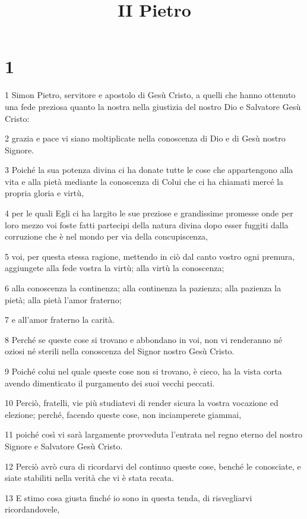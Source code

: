 

\title{II Pietro}


\chapter{1}

\par 1 Simon Pietro, servitore e apostolo di Gesù Cristo, a quelli che hanno ottenuto una fede preziosa quanto la nostra nella giustizia del nostro Dio e Salvatore Gesù Cristo:
\par 2 grazia e pace vi siano moltiplicate nella conoscenza di Dio e di Gesù nostro Signore.
\par 3 Poiché la sua potenza divina ci ha donate tutte le cose che appartengono alla vita e alla pietà mediante la conoscenza di Colui che ci ha chiamati mercé la propria gloria e virtù,
\par 4 per le quali Egli ci ha largito le sue preziose e grandissime promesse onde per loro mezzo voi foste fatti partecipi della natura divina dopo esser fuggiti dalla corruzione che è nel mondo per via della concupiscenza,
\par 5 voi, per questa stessa ragione, mettendo in ciò dal canto vostro ogni premura, aggiungete alla fede vostra la virtù; alla virtù la conoscenza;
\par 6 alla conoscenza la continenza; alla continenza la pazienza; alla pazienza la pietà; alla pietà l'amor fraterno;
\par 7 e all'amor fraterno la carità.
\par 8 Perché se queste cose si trovano e abbondano in voi, non vi renderanno né oziosi né sterili nella conoscenza del Signor nostro Gesù Cristo.
\par 9 Poiché colui nel quale queste cose non si trovano, è cieco, ha la vista corta avendo dimenticato il purgamento dei suoi vecchi peccati.
\par 10 Perciò, fratelli, vie più studiatevi di render sicura la vostra vocazione ed elezione; perché, facendo queste cose, non inciamperete giammai,
\par 11 poiché così vi sarà largamente provveduta l'entrata nel regno eterno del nostro Signore e Salvatore Gesù Cristo.
\par 12 Perciò avrò cura di ricordarvi del continuo queste cose, benché le conosciate, e siate stabiliti nella verità che vi è stata recata.
\par 13 E stimo cosa giusta finché io sono in questa tenda, di risvegliarvi ricordandovele,
